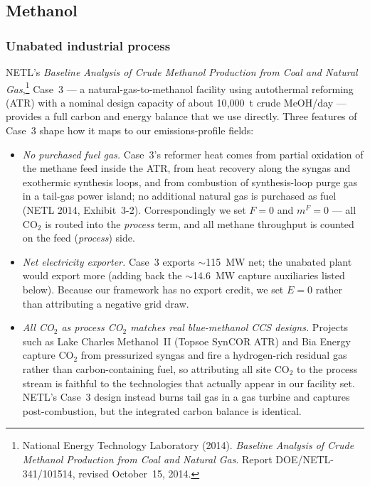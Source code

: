 \documentclass[11pt]{article}
\begin{document}
\subsection{Methanol}
\label{sec:const_meoh}

\subsubsection{Unabated industrial process}

NETL's \emph{Baseline Analysis of Crude Methanol Production from Coal and Natural Gas},\footnote{National Energy Technology Laboratory (2014). \emph{Baseline Analysis of Crude Methanol Production from Coal and Natural Gas}. Report DOE/NETL-341/101514, revised October~15, 2014.} Case~3 --- a natural-gas-to-methanol facility using autothermal reforming (ATR) with a nominal design capacity of about 10{,}000~t crude MeOH/day --- provides a full carbon and energy balance that we use directly. Three features of Case~3 shape how it maps to our emissions-profile fields:

\begin{itemize}
  \item \emph{No purchased fuel gas.} Case~3's reformer heat comes from partial oxidation of the methane feed inside the ATR, from heat recovery along the syngas and exothermic synthesis loops, and from combustion of synthesis-loop purge gas in a tail-gas power island; no additional natural gas is purchased as fuel (NETL 2014, Exhibit~3-2). Correspondingly we set $F = 0$ and $m^F = 0$ --- all CO$_2$ is routed into the \emph{process} term, and all methane throughput is counted on the feed (\emph{process}) side.
  \item \emph{Net electricity exporter.} Case~3 exports $\sim$115~MW net; the unabated plant would export more (adding back the $\sim$14.6~MW capture auxiliaries listed below). Because our framework has no export credit, we set $E = 0$ rather than attributing a negative grid draw.
  \item \emph{All CO$_2$ as process CO$_2$ matches real blue-methanol CCS designs.} Projects such as Lake Charles Methanol~II (Topsoe SynCOR ATR) and Bia Energy capture CO$_2$ from pressurized syngas and fire a hydrogen-rich residual gas rather than carbon-containing fuel, so attributing all site CO$_2$ to the process stream is faithful to the technologies that actually appear in our facility set. NETL's Case~3 design instead burns tail gas in a gas turbine and captures post-combustion, but the integrated carbon balance is identical.
\end{itemize}
\end{document}
